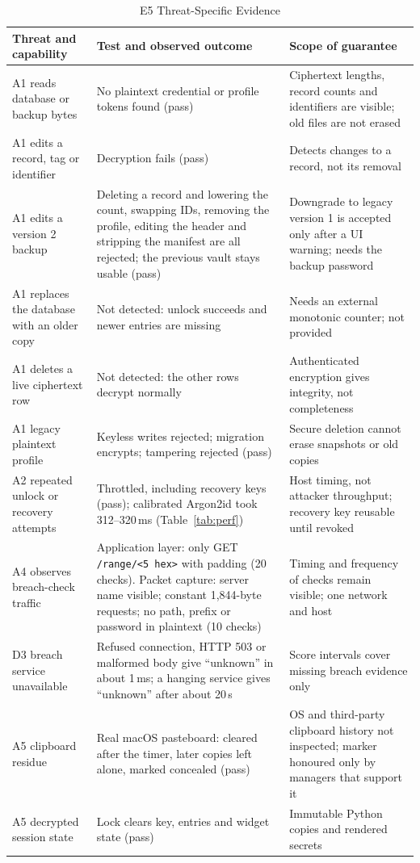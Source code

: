 \documentclass[preprint,12pt]{elsarticle}
\begin{document}
\begin{table}[t]
\caption{E5 Threat-Specific Evidence}
\label{tab:sec}
\centering\scriptsize
\begin{tabular}{@{}p{}p{}p{}@{}}
\toprule
Threat and capability & Test and observed outcome & Scope of guarantee\\
\midrule
A1 reads database or backup bytes & No plaintext credential or profile tokens found (pass) & Ciphertext lengths, record counts and identifiers are visible; old files are not erased\\
A1 edits a record, tag or identifier & Decryption fails (pass) & Detects changes to a record, not its removal\\
A1 edits a version 2 backup & Deleting a record and lowering the count, swapping IDs, removing the profile, editing the header and stripping the manifest are all rejected; the previous vault stays usable (pass) & Downgrade to legacy version 1 is accepted only after a UI warning; needs the backup password\\
A1 replaces the database with an older copy & Not detected: unlock succeeds and newer entries are missing & Needs an external monotonic counter; not provided\\
A1 deletes a live ciphertext row & Not detected: the other rows decrypt normally & Authenticated encryption gives integrity, not completeness\\
A1 legacy plaintext profile & Keyless writes rejected; migration encrypts; tampering rejected (pass) & Secure deletion cannot erase snapshots or old copies\\
A2 repeated unlock or recovery attempts & Throttled, including recovery keys (pass); calibrated Argon2id took 312--320\,ms (Table~\ref{tab:perf}) & Host timing, not attacker throughput; recovery key reusable until revoked\\
A4 observes breach-check traffic & Application layer: only GET \texttt{/range/<5 hex>} with padding (20 checks). Packet capture: server name visible; constant 1,844-byte requests; no path, prefix or password in plaintext (10 checks) & Timing and frequency of checks remain visible; one network and host\\
D3 breach service unavailable & Refused connection, HTTP 503 or malformed body give ``unknown'' in about 1\,ms; a hanging service gives ``unknown'' after about 20\,s & Score intervals cover missing breach evidence only\\
A5 clipboard residue & Real macOS pasteboard: cleared after the timer, later copies left alone, marked concealed (pass) & OS and third-party clipboard history not inspected; marker honoured only by managers that support it\\
A5 decrypted session state & Lock clears key, entries and widget state (pass) & Immutable Python copies and rendered secrets\\
\bottomrule
\end{tabular}
\end{table}
\end{document}
